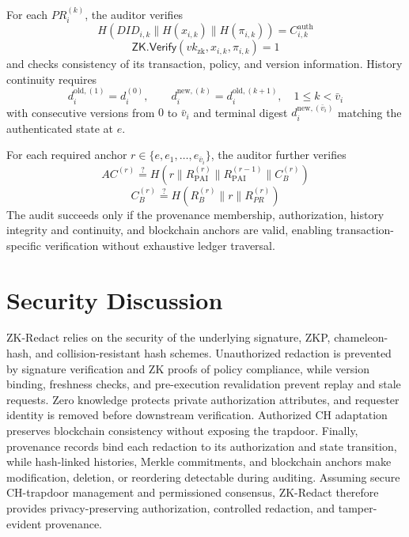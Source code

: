 \documentclass[lettersize,journal]{IEEEtran}
\begin{document}
For each $PR_i^{(k)}$, the auditor verifies
\begin{equation}
H(DID_{i,k}\parallel H(x_{i,k})\parallel H(\pi_{i,k}))
=C_{i,k}^{\mathrm{auth}}
\end{equation}
\begin{equation}
\mathsf{ZK.Verify}(vk_{\mathrm{zk}},x_{i,k},\pi_{i,k})=1
\end{equation}
and checks consistency of its transaction, policy, and version information.
History continuity requires
\begin{equation}
d_i^{\mathrm{old},(1)}=d_i^{(0)},\qquad
d_i^{\mathrm{new},(k)}=d_i^{\mathrm{old},(k+1)},
\quad 1\le k<\bar v_i
\label{eq:audit-continuity}
\end{equation}
with consecutive versions from $0$ to $\bar v_i$ and terminal digest
$d_i^{\mathrm{new},(\bar v_i)}$ matching the authenticated state at $e$.

For each required anchor $r\in\{e,e_1,\ldots,e_{\bar v_i}\}$, the auditor
further verifies
\begin{equation}
AC^{(r)}
\stackrel{?}{=}
H(r\parallel R_{\mathrm{PAI}}^{(r)}
\parallel R_{\mathrm{PAI}}^{(r-1)}\parallel C_B^{(r)})
\end{equation}
\begin{equation}
C_B^{(r)}
\stackrel{?}{=}
H(R_B^{(r)}\parallel r\parallel R_{PR}^{(r)})
\end{equation}
The audit succeeds only if the provenance membership, authorization,
history integrity and continuity, and blockchain anchors are valid,
enabling transaction-specific verification without exhaustive ledger
traversal.


\section{Security Discussion}

ZK-Redact relies on the security of the underlying signature, ZKP,
chameleon-hash, and collision-resistant hash schemes. Unauthorized
redaction is prevented by signature verification and ZK proofs of policy
compliance, while version binding, freshness checks, and pre-execution
revalidation prevent replay and stale requests. Zero knowledge protects
private authorization attributes, and requester identity is removed
before downstream verification. Authorized CH adaptation preserves
blockchain consistency without exposing the trapdoor. Finally, provenance
records bind each redaction to its authorization and state transition,
while hash-linked histories, Merkle commitments, and blockchain anchors
make modification, deletion, or reordering detectable during auditing.
Assuming secure CH-trapdoor management and permissioned consensus,
ZK-Redact therefore provides privacy-preserving authorization, controlled
redaction, and tamper-evident provenance.
\end{document}
